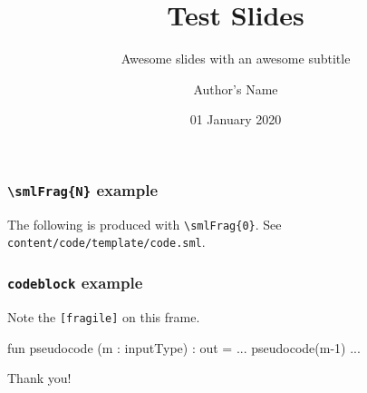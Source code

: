 \documentclass[aspectratio=54]{beamer}
\title{Test Slides} %
\subtitle{Awesome slides with an awesome subtitle} %
\date{01 January 2020} %
\author{Author's Name} %
\newif\ifcolorlambda
\begin{document}
\ifweb
   \renewcommand{\pause}{}
\fi


{
\begin{frame}[plain]
\colorlambdatrue
\titlepage
\end{frame}
}
{
\begin{frame}[plain]
\colorlambdafalse
{}
\end{frame}
}

\begin{frame}
\frametitle{\texttt{\textbackslash smlFrag\{N\}} example}
The following is produced with \texttt{\textbackslash smlFrag\{0\}}. See \texttt{content/code/template/code.sml}. \pause

\end{frame}

\begin{frame}[fragile]
\frametitle{\texttt{codeblock} example}
Note the \texttt{[fragile]} on this frame.\pause

\begin{codeblock}
   fun pseudocode (m : inputType) : out =
             ...
         pseudocode(m-1)
             ...
\end{codeblock}
\end{frame}

\begin{frame}
\begin{center} Thank you! \end{center}
\end{frame}
\end{document}

